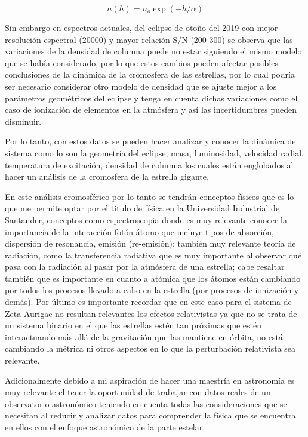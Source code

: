 \documentclass[11pt]{article}
\begin{document}
\begin{equation}
    n(h) = n_o \exp{(-h/\alpha)}
\end{equation}{}
\vspace{2mm}

Sin embargo en espectros actuales, del eclipse de otoño del 2019 con mejor resolución espectral (20000) y mayor relación S/N (200-300) se observa que las variaciones de la densidad de columna puede no estar siguiendo el mismo modelo que se había considerado, por lo que estos cambios pueden afectar posibles conclusiones de la dinámica de la cromosfera de las estrellas, por lo cual podría ser necesario considerar otro modelo de densidad que se ajuste mejor a los parámetros geométricos del eclipse y tenga en cuenta dichas variaciones como el caso de ionización de elementos en la atmósfera y así  las incertidumbres pueden disminuir.

Por lo tanto, con estos datos se pueden hacer analizar y conocer la dinámica del sistema como lo son la geometría del eclipse, masa, luminosidad, velocidad radial, temperatura de excitación, densidad de columna los cuales están englobados al hacer un análisis de la cromosfera de la estrella gigante. 

En este análisis cromosférico por lo tanto se tendrán conceptos físicos que es lo que me permite optar por el título de física en la Universidad Industrial de Santander, conceptos como espectroscopia donde es muy relevante conocer la importancia de la interacción fotón-átomo que incluye tipos de absorción, dispersión de resonancia, emisión (re-emisión); también muy relevante teoría de radiación, como la transferencia radiativa que es muy importante al observar qué pasa con la radiación al pasar por la atmósfera de una estrella; cabe resaltar también que es importante en cuanto a atómica que los átomos están cambiando por todos los procesos llevado a cabo en la estrella (por procesos de ionización y demás). Por último es importante recordar que en este caso para el sistema de Zeta Aurigae no resultan relevantes los efectos relativistas ya que no se trata de un sistema binario en el que las estrellas estén tan próximas que estén interactuando más allá de la gravitación que las mantiene en órbita, no está cambiando la métrica ni otros aspectos en lo que la perturbación relativista sea relevante.

\noindent Adicionalmente debido a mi aspiración de hacer una maestría en astronomía es muy relevante el tener la oportunidad de trabajar con datos reales de un observatorio astronómico teniendo en cuenta todas las consideraciones que se necesitan al reducir y analizar datos para comprender la física que se encuentra en ellos con el enfoque astronómico de la parte estelar.
\end{document}
